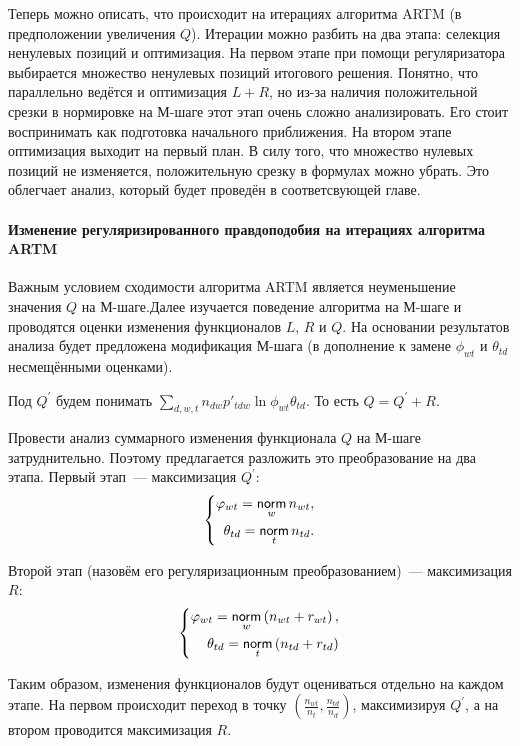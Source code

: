 \documentclass[12pt, twoside]{article}
\begin{document}
Теперь можно описать, что происходит на итерациях алгоритма ARTM (в предположении увеличения $Q$). Итерации можно разбить на два этапа: селекция ненулевых позиций и оптимизация. На первом этапе при помощи регуляризатора выбирается множество ненулевых позиций итогового решения. Понятно, что параллельно ведётся и оптимизация $L + R$, но из-за наличия положительной срезки в нормировке на М-шаге этот этап очень сложно анализировать. Его стоит воспринимать как подготовка начального приближения. На втором этапе оптимизация выходит на первый план. В силу того, что множество нулевых позиций не изменяется, положительную срезку в формулах можно убрать. Это облегчает анализ, который будет проведён в соответсвующей главе.

\paragraph{Изменение регуляризированного правдоподобия на итерациях алгоритма ARTM}
Важным условием сходимости алгоритма ARTM является неуменьшение значения $Q$ на М-шаге.Далее изучается поведение алгоритма на М-шаге и проводятся оценки изменения функционалов $L$, $R$ и $Q$. На основании результатов анализа будет предложена  модификация М-шага (в дополнение к замене $\phi_{wt}$ и $\theta_{td}$ несмещёнными оценками).

Под $Q^{\prime}$ будем понимать $\sum\limits_{d, w, t} n_{dw} p'_{tdw} \ln{\phi_{wt}\theta_{td}}$. То есть $Q = Q^{\prime} +  R$.

Провести анализ суммарного изменения функционала $Q$ на М-шаге затруднительно. Поэтому предлагается разложить это преобразование на два этапа. Первый этап~--- максимизация $Q^{\prime}$:
\[
\left\{
	\begin{aligned}
		\varphi_{wt} = \mathop{\mathsf{norm}}\limits_w  n_{wt},\\
		\theta_{td} = \mathop{\mathsf{norm}}\limits_t n_{td} .
	\end{aligned}
\right.
\]

Второй этап (назовём его регуляризационным преобразованием)~--- максимизация $R$:
\[
\left\{
\begin{aligned}
 \varphi_{wt}  = \mathop{\mathsf{norm}}\limits_w \left(n_{wt} + r_{wt} \right),\\
\theta_{td} = \mathop{\mathsf{norm}}\limits_t  \left(n_{td} + r_{td}\right)
\end{aligned}
\right.
\]

Таким образом, изменения функционалов будут оцениваться  отдельно на каждом этапе. На первом происходит переход в точку $\left(\frac{n_{wt}}{n_t}, \frac{n_{td}}{n_d}\right)$, максимизируя $Q^{\prime}$, а на втором проводится максимизация $R$. 
\end{document}
